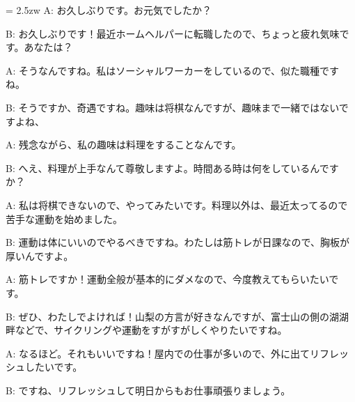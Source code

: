 \documentclass[11pt]{amsart}
\title{}
\author{}
\newenvironment{hangall}[1]{\hangindent = 2.5zw\everypar{\hangindent = 2.5zw}}{}
\begin{document}
\maketitle
\begin{hangall}{}%
A: お久しぶりです。お元気でしたか？

B: お久しぶりです！最近ホームヘルパーに転職したので、ちょっと疲れ気味です。あなたは？

A: そうなんですね。私はソーシャルワーカーをしているので、似た職種ですね。

B: そうですか、奇遇ですね。趣味は将棋なんですが、趣味まで一緒ではないですよね、

A: 残念ながら、私の趣味は料理をすることなんです。

B: へえ、料理が上手なんて尊敬しますよ。時間ある時は何をしているんですか？

A: 私は将棋できないので、やってみたいです。料理以外は、最近太ってるので苦手な運動を始めました。

B: 運動は体にいいのでやるべきですね。わたしは筋トレが日課なので、胸板が厚いんですよ。

A: 筋トレですか！運動全般が基本的にダメなので、今度教えてもらいたいです。

B: ぜひ、わたしでよければ！山梨の方言が好きなんですが、富士山の側の湖湖畔などで、サイクリングや運動をすがすがしくやりたいですね。

A: なるほど。それもいいですね！屋内での仕事が多いので、外に出てリフレッシュしたいです。

B: ですね、リフレッシュして明日からもお仕事頑張りましょう。
\end{hangall}
\end{document}

